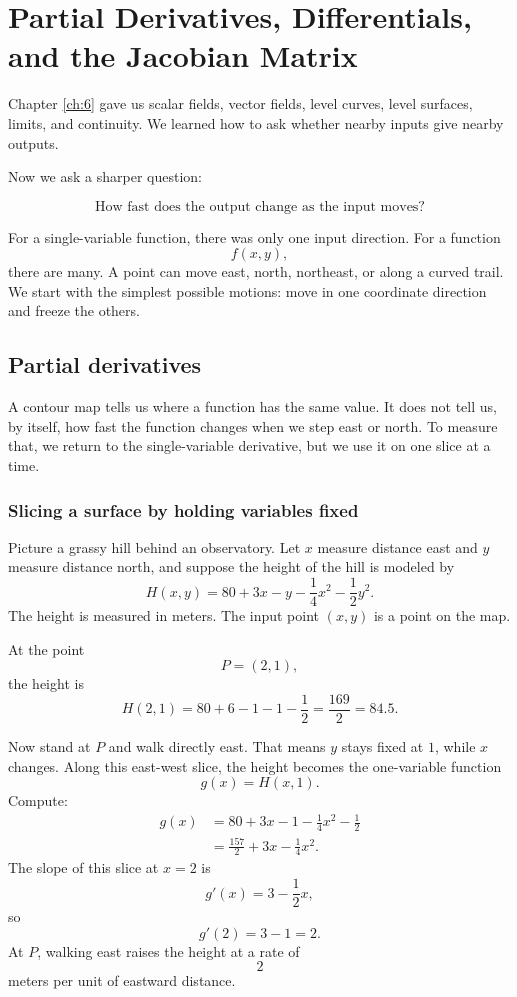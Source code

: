 
\chapter{Partial Derivatives, Differentials, and the Jacobian Matrix}
\label{ch:7}

Chapter \ref{ch:6} gave us scalar fields, vector fields, level curves, level surfaces,
limits, and continuity.  We learned how to ask whether nearby inputs give nearby
outputs.

Now we ask a sharper question:

\[
    \text{How fast does the output change as the input moves?}
\]

For a single-variable function, there was only one input direction.  For a function
\[
    f(x,y),
\]
there are many.  A point can move east, north, northeast, or along a curved trail.  We
start with the simplest possible motions: move in one coordinate direction and freeze
the others.

\section{Partial derivatives}
\label{sec:7.1}

A contour map tells us where a function has the same value.  It does not tell us, by
itself, how fast the function changes when we step east or north.  To measure that,
we return to the single-variable derivative, but we use it on one slice at a time.

\subsection{Slicing a surface by holding variables fixed}

Picture a grassy hill behind an observatory.  Let \(x\) measure distance east and \(y\)
measure distance north, and suppose the height of the hill is modeled by
\[
    H(x,y)=80+3x-y-\frac14 x^2-\frac12 y^2.
\]
The height is measured in meters.  The input point \((x,y)\) is a point on the map.

At the point
\[
    P=(2,1),
\]
the height is
\[
    H(2,1)=80+6-1-1-\frac12=\frac{169}{2}=84.5.
\]

Now stand at \(P\) and walk directly east.  That means \(y\) stays fixed at \(1\), while
\(x\) changes.  Along this east-west slice, the height becomes the one-variable function
\[
    g(x)=H(x,1).
\]
Compute:
\[
\begin{aligned}
    g(x)
    &=
    80+3x-1-\frac14 x^2-\frac12        \\
    &=
    \frac{157}{2}+3x-\frac14 x^2.
\end{aligned}
\]
The slope of this slice at \(x=2\) is
\[
    g'(x)=3-\frac12 x,
\]
so
\[
    g'(2)=3-1=2.
\]
At \(P\), walking east raises the height at a rate of
\[
    2
\]
meters per unit of eastward distance.

